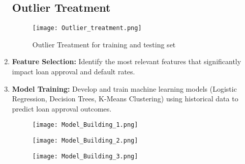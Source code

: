 \documentclass[10pt]{article}
\begin{document}
\begin{enumerate}
    \subsection*{Outlier Treatment}
            \begin{figure}[H]
            \begin{center}
                \texttt{[image: Outlier\_treatment.png]}
                \caption{Outlier Treatment for training and testing set}
                \label{fig:sub1}
            \end{center}
            \end{figure}
    \item \textbf{Feature Selection:} Identify the most relevant features that significantly impact loan approval and default rates.
    
    \item \textbf{Model Training:} Develop and train machine learning models (Logistic Regression, Decision Trees, K-Means Clustering) using historical data to predict loan approval outcomes.
\begin{figure}[H]
\begin{center}
        \texttt{[image: Model\_Building\_1.png]}
        \label{fig:sub1}
\end{center}
\end{figure}
\begin{figure}[H]
\begin{center}
        \texttt{[image: Model\_Building\_2.png]}
        \label{fig:sub1}
\end{center}
\end{figure}
\begin{figure}[H]
\begin{center}
        \texttt{[image: Model\_Building\_3.png]}
        \label{fig:sub1}
\end{center}
\end{figure}
    

\end{enumerate}
\end{document}
